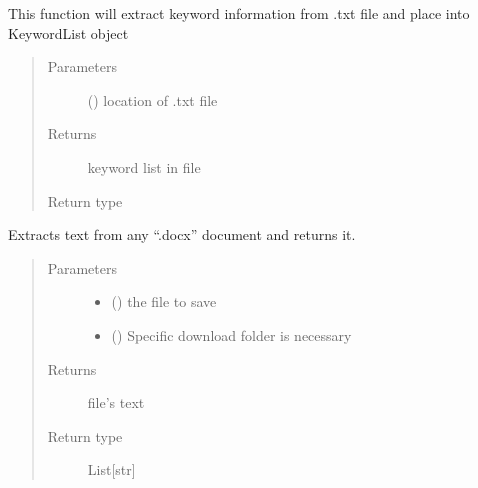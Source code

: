 \documentclass[letterpaper,10pt,english]{sphinxmanual}
\begin{document}

\begin{fulllineitems}
\label{\detokenize{functionsv1:common_functions.extractkeywordfromtxt}}
This function will extract keyword information from .txt file and place into KeywordList object
\begin{quote}\begin{description}
\item[{Parameters}] \leavevmode
{} () \textendash{} location of .txt file

\item[{Returns}] \leavevmode
keyword list in file

\item[{Return type}] \leavevmode
{\hyperref[\detokenize{KeywordList:module-KeywordList}]{}}

\end{description}\end{quote}

\end{fulllineitems}


\begin{fulllineitems}
\label{\detokenize{functionsv1:common_functions.extractmicrosoftdocxtext}}
Extracts text from any “.docx” document and returns it.
\begin{quote}\begin{description}
\item[{Parameters}] \leavevmode\begin{itemize}
\item {} 
 () \textendash{} the file to save

\item {} 
 () \textendash{} Specific download folder is necessary

\end{itemize}

\item[{Returns}] \leavevmode
file’s text

\item[{Return type}] \leavevmode
List{[}str{]}

\end{description}\end{quote}

\end{fulllineitems}
\end{document}

